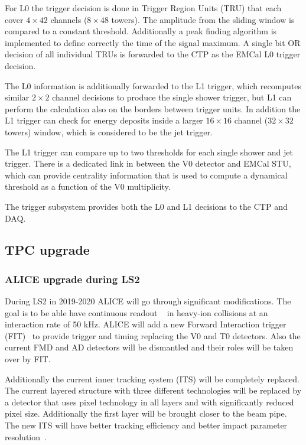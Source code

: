 For L0 the trigger decision is done in Trigger Region Units (TRU) that each cover $4\times42$ channels ($8\times48$ towers). The amplitude from the sliding window is compared to a constant threshold. Additionally a peak finding algorithm is implemented to define correctly the time of the signal maximum. A single bit OR decision of all individual TRUs is forwarded to the CTP as the EMCal L0 trigger decision.

The L0 information is additionally forwarded to the L1 trigger, which recomputes similar $2\times2$ channel decisions to produce the single shower trigger, but L1 can perform the calculation also on the borders between trigger units. In addition the L1 trigger can  check for energy deposits inside a larger $16\times16$ channel ($32\times32$ towers) window, which is considered to be the jet trigger.

The L1 trigger can compare up to two thresholds for each single shower and jet trigger. There is a dedicated link in between the V0 detector and EMCal STU, which can provide centrality information that is used to compute a dynamical threshold as a function of the V0 multiplicity.

The trigger subsystem provides both the L0 and L1 decisions to the CTP and DAQ. 


\subsection{TPC upgrade}
\label{sec:tpcupgrade}
\subsubsection{ALICE upgrade during LS2}
During LS2 in 2019-2020 ALICE will go through significant modifications. The goal is to be able have continuous readout ~\cite{aliceupgrade} in heavy-ion collisions at an interaction rate of 50 kHz.  ALICE will add a new Forward Interaction trigger (FIT)~\cite{Maevskaya:2019bba} to provide trigger and timing replacing the V0 and T0 detectors. Also the current FMD and AD detectors will be dismantled and their roles will be taken over by FIT.

Additionally the current inner tracking system (ITS) will be completely replaced. The current layered structure with three different technologies will be replaced by a detector that uses pixel technology in all layers and with significantly reduced pixel size. Additionally the first layer will be brought closer to the beam pipe. The new ITS will have better tracking efficiency and better impact parameter resolution~\cite{ITSupgrade}. 

